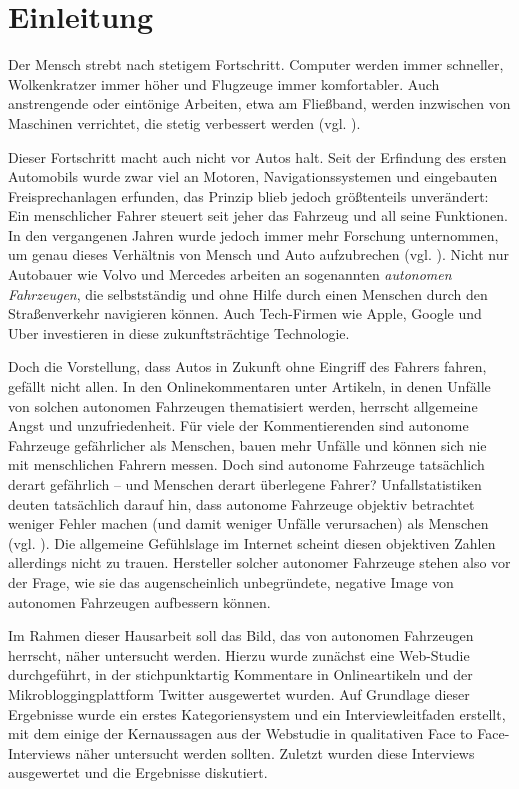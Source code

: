 \section{Einleitung}

Der Mensch strebt nach stetigem Fortschritt. Computer werden immer schneller, Wolkenkratzer immer höher und Flugzeuge immer komfortabler. Auch anstrengende oder eintönige Arbeiten, etwa am Fließband, werden inzwischen von Maschinen verrichtet, die stetig verbessert werden (vgl. \cite{makino1994new}).

Dieser Fortschritt macht auch nicht vor Autos halt. Seit der Erfindung des ersten Automobils wurde zwar viel an Motoren, Navigationssystemen und eingebauten Freisprechanlagen erfunden, das Prinzip blieb jedoch größtenteils unverändert: Ein menschlicher Fahrer steuert seit jeher das Fahrzeug und all seine Funktionen. In den vergangenen Jahren wurde jedoch immer mehr Forschung unternommen, um genau dieses Verhältnis von Mensch und Auto aufzubrechen (vgl. \cite{wei2013towards}). Nicht nur Autobauer wie Volvo und Mercedes arbeiten an sogenannten \emph{autonomen Fahrzeugen}, die selbstständig und ohne Hilfe durch einen Menschen durch den Straßenverkehr navigieren können. Auch Tech-Firmen wie Apple, Google und Uber investieren in diese zukunftsträchtige Technologie.

Doch die Vorstellung, dass Autos in Zukunft ohne Eingriff des Fahrers fahren, gefällt nicht allen. In den Onlinekommentaren unter Artikeln, in denen Unfälle von solchen autonomen Fahrzeugen thematisiert werden, herrscht allgemeine Angst und unzufriedenheit. Für viele der Kommentierenden sind autonome Fahrzeuge gefährlicher als Menschen, bauen mehr Unfälle und können sich nie mit menschlichen Fahrern messen. Doch sind autonome Fahrzeuge tatsächlich derart gefährlich -- und Menschen derart überlegene Fahrer? Unfallstatistiken deuten tatsächlich darauf hin, dass autonome Fahrzeuge objektiv betrachtet weniger Fehler machen (und damit weniger Unfälle verursachen) als Menschen (vgl. \cite{singh2015critical}). Die allgemeine Gefühlslage im Internet scheint diesen objektiven Zahlen allerdings nicht zu trauen. Hersteller solcher autonomer Fahrzeuge stehen also vor der Frage, wie sie das augenscheinlich unbegründete, negative Image von autonomen Fahrzeugen aufbessern können.

Im Rahmen dieser Hausarbeit soll das Bild, das von autonomen Fahrzeugen herrscht, näher untersucht werden. Hierzu wurde zunächst eine Web-Studie durchgeführt, in der stichpunktartig Kommentare in Onlineartikeln und der Mikrobloggingplattform Twitter ausgewertet wurden. Auf Grundlage dieser Ergebnisse wurde ein erstes Kategoriensystem und ein Interviewleitfaden erstellt, mit dem einige der Kernaussagen aus der Webstudie in qualitativen Face to Face-Interviews näher untersucht werden sollten. Zuletzt wurden diese Interviews ausgewertet und die Ergebnisse diskutiert.
